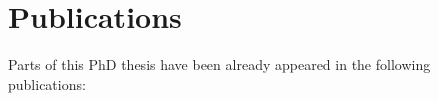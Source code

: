 \chapter*{Publications}
Parts of this PhD thesis have been already appeared in the following publications:

\begin{refsection}
    \small
    \nocite{guse_macro-temporal_2013}
    \nocite{guse_modelling_2014}
    \printbibliography[heading=none]
\end{refsection}